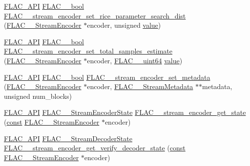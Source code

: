 \begin{DoxyCompactItemize}
\item 
\hyperlink{group__flac__export_ga56ca07df8a23310707732b1c0007d6f5}{F\+L\+A\+C\+\_\+\+A\+PI} \hyperlink{ordinals_8h_a95103469f1cbd78b8cf250194985b34e}{F\+L\+A\+C\+\_\+\+\_\+bool} \hyperlink{group__flac__stream__encoder_ga668de93e7061bce21475c062ffab3e18}{F\+L\+A\+C\+\_\+\+\_\+stream\+\_\+encoder\+\_\+set\+\_\+rice\+\_\+parameter\+\_\+search\+\_\+dist} (\hyperlink{struct_f_l_a_c_____stream_encoder}{F\+L\+A\+C\+\_\+\+\_\+\+Stream\+Encoder} $\ast$encoder, unsigned \hyperlink{lib_2expat_8h_a4a30a13b813682e68c5b689b45c65971}{value})
\item 
\hyperlink{group__flac__export_ga56ca07df8a23310707732b1c0007d6f5}{F\+L\+A\+C\+\_\+\+A\+PI} \hyperlink{ordinals_8h_a95103469f1cbd78b8cf250194985b34e}{F\+L\+A\+C\+\_\+\+\_\+bool} \hyperlink{group__flac__stream__encoder_ga0d3f45052f2f7379c73e2b027c7f956c}{F\+L\+A\+C\+\_\+\+\_\+stream\+\_\+encoder\+\_\+set\+\_\+total\+\_\+samples\+\_\+estimate} (\hyperlink{struct_f_l_a_c_____stream_encoder}{F\+L\+A\+C\+\_\+\+\_\+\+Stream\+Encoder} $\ast$encoder, \hyperlink{ordinals_8h_aa78c8c70a3eb8a58af7436f278acde8e}{F\+L\+A\+C\+\_\+\+\_\+uint64} \hyperlink{lib_2expat_8h_a4a30a13b813682e68c5b689b45c65971}{value})
\item 
\hyperlink{group__flac__export_ga56ca07df8a23310707732b1c0007d6f5}{F\+L\+A\+C\+\_\+\+A\+PI} \hyperlink{ordinals_8h_a95103469f1cbd78b8cf250194985b34e}{F\+L\+A\+C\+\_\+\+\_\+bool} \hyperlink{group__flac__stream__encoder_ga67b30b1a67a9274f7708a22154b225f6}{F\+L\+A\+C\+\_\+\+\_\+stream\+\_\+encoder\+\_\+set\+\_\+metadata} (\hyperlink{struct_f_l_a_c_____stream_encoder}{F\+L\+A\+C\+\_\+\+\_\+\+Stream\+Encoder} $\ast$encoder, \hyperlink{struct_f_l_a_c_____stream_metadata}{F\+L\+A\+C\+\_\+\+\_\+\+Stream\+Metadata} $\ast$$\ast$metadata, unsigned num\+\_\+blocks)
\item 
\hyperlink{group__flac__export_ga56ca07df8a23310707732b1c0007d6f5}{F\+L\+A\+C\+\_\+\+A\+PI} \hyperlink{group__flac__stream__encoder_gac5e9db4fc32ca2fa74abd9c8a87c02a5}{F\+L\+A\+C\+\_\+\+\_\+\+Stream\+Encoder\+State} \hyperlink{group__flac__stream__encoder_gaff7284e55f01b59ed8f03317df510992}{F\+L\+A\+C\+\_\+\+\_\+stream\+\_\+encoder\+\_\+get\+\_\+state} (\hyperlink{getopt1_8c_a2c212835823e3c54a8ab6d95c652660e}{const} \hyperlink{struct_f_l_a_c_____stream_encoder}{F\+L\+A\+C\+\_\+\+\_\+\+Stream\+Encoder} $\ast$encoder)
\item 
\hyperlink{group__flac__export_ga56ca07df8a23310707732b1c0007d6f5}{F\+L\+A\+C\+\_\+\+A\+PI} \hyperlink{group__flac__stream__decoder_ga3adb6891c5871a87cd5bbae6c770ba2d}{F\+L\+A\+C\+\_\+\+\_\+\+Stream\+Decoder\+State} \hyperlink{group__flac__stream__encoder_gac613bebe4181568e7ca59cca30294e52}{F\+L\+A\+C\+\_\+\+\_\+stream\+\_\+encoder\+\_\+get\+\_\+verify\+\_\+decoder\+\_\+state} (\hyperlink{getopt1_8c_a2c212835823e3c54a8ab6d95c652660e}{const} \hyperlink{struct_f_l_a_c_____stream_encoder}{F\+L\+A\+C\+\_\+\+\_\+\+Stream\+Encoder} $\ast$encoder)
$$
\end{DoxyCompactItemize}
